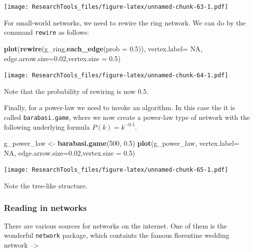 \documentclass[]{article}
\newenvironment{Shaded}{\begin{snugshade}}{\end{snugshade}}
\newcommand{\KeywordTok}[1]{\textcolor[rgb]{0.13,0.29,0.53}{\textbf{#1}}}
\newcommand{\DataTypeTok}[1]{\textcolor[rgb]{0.13,0.29,0.53}{#1}}
\newcommand{\DecValTok}[1]{\textcolor[rgb]{0.00,0.00,0.81}{#1}}
\newcommand{\FloatTok}[1]{\textcolor[rgb]{0.00,0.00,0.81}{#1}}
\newcommand{\StringTok}[1]{\textcolor[rgb]{0.31,0.60,0.02}{#1}}
\newcommand{\OtherTok}[1]{\textcolor[rgb]{0.56,0.35,0.01}{#1}}
\newcommand{\NormalTok}[1]{#1}
\theoremstyle{definition}
\theoremstyle{definition}
\theoremstyle{definition}
\theoremstyle{remark}
\begin{document}
\texttt{[image: ResearchTools\_files/figure-latex/unnamed-chunk-63-1.pdf]}

For small-world networks, we need to rewire the ring network. We can do
by the command \texttt{rewire} as follows:

\begin{Shaded}
\begin{Highlighting}[]
\KeywordTok{plot}\NormalTok{(}\KeywordTok{rewire}\NormalTok{(g_ring,}\KeywordTok{each_edge}\NormalTok{(}\DataTypeTok{prob =} \FloatTok{0.5}\NormalTok{)), }\DataTypeTok{vertex.label=} \OtherTok{NA}\NormalTok{, }\DataTypeTok{edge.arrow.size=}\FloatTok{0.02}\NormalTok{,}\DataTypeTok{vertex.size =} \FloatTok{0.5}\NormalTok{)}
\end{Highlighting}
\end{Shaded}

\texttt{[image: ResearchTools\_files/figure-latex/unnamed-chunk-64-1.pdf]}

Note that the probability of rewiring is now 0.5.

Finally, for a power-law we need to invoke an algorithm. In this case
the it is called \texttt{barabasi.game}, where we now create a power-law
type of network with the following underlying formula
\(P(k) = k^{-0.5}\).

\begin{Shaded}
\begin{Highlighting}[]
\NormalTok{g_power_law <-}\StringTok{ }\KeywordTok{barabasi.game}\NormalTok{(}\DecValTok{500}\NormalTok{, }\FloatTok{0.5}\NormalTok{)}
\KeywordTok{plot}\NormalTok{(g_power_law, }\DataTypeTok{vertex.label=} \OtherTok{NA}\NormalTok{, }\DataTypeTok{edge.arrow.size=}\FloatTok{0.02}\NormalTok{,}\DataTypeTok{vertex.size =} \FloatTok{0.5}\NormalTok{)}
\end{Highlighting}
\end{Shaded}

\texttt{[image: ResearchTools\_files/figure-latex/unnamed-chunk-65-1.pdf]}

Note the tree-like structure.

\subsubsection{Reading in networks}\label{reading-in-networks}

There are various sources for networks on the internet. One of them is
the wonderful \texttt{network} package, which containts the famous
florentine wedding network --\textgreater{}
\end{document}
